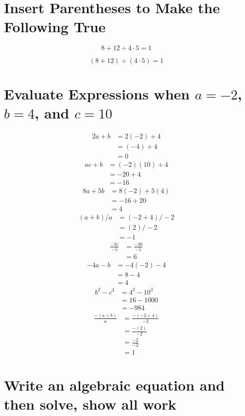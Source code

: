 \documentclass[11pt]{article} %
\begin{document}
\section{Insert Parentheses to Make the Following True}
\[ 8 + 12 \div 4 \cdot 5 = 1 \] 

 \[ (8 + 12) \div (4 \cdot 5) = 1 \]

\section{Evaluate Expressions when $a=-2$, $b = 4$, and $c = 10$}
\begin{align*}
2a + b &= 2 (-2) + 4 \\
&= (-4) + 4 \\
&= 0
\end{align*}
\begin{align*}
ac + b &= (-2)(10) + 4 \\
&= -20 + 4 \\
&= -16
\end{align*}
\begin{align*}
8a + 5b &= 8(-2) + 5(4) \\
&= -16 + 20 \\
&= 4
\end{align*}
\begin{align*}
(a + b)/a &= (-2 + 4)/-2 \\
&= (2)/-2 \\
&= -1
\end{align*}
\begin{align*}
\frac{-3c}{-5} &= \frac{-30}{-5} \\
&= 6
\end{align*}
\begin{align*}
-4a - b &= -4(-2) - 4 \\
&= 8 - 4 \\
&= 4
\end{align*}
\begin{align*}
b^2 - c^3 &= 4^2 - 10^3 \\
&= 16 - 1000 \\
&= -984
\end{align*}
\begin{align*}
\frac{-(a+b)}{a} &= \frac{-(-2 + 4)}{-2} \\
&= \frac{-(2)}{-2} \\
&= \frac{-2}{-2} \\
&= 1
\end{align*}

\section{Write an algebraic equation and then solve, show all work}
\end{document}
